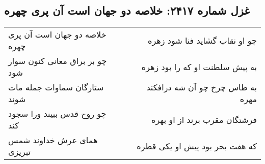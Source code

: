 \begin{center}
\section*{غزل شماره ۲۴۱۷: خلاصه دو جهان است آن پری چهره}
\label{sec:2417}
\begin{longtable}{l p{0.5cm} r}
خلاصه دو جهان است آن پری چهره
&&
چو او نقاب گشاید فنا شود زهره
\\
چو بر براق معانی کنون سوار شود
&&
به پیش سلطنت او که را بود زهره
\\
ستارگان سماوات جمله مات شوند
&&
به طاس چرخ چو آن شه درافکند مهره
\\
چو روح قدس ببیند ورا سجود کند
&&
فرشتگان مقرب برند از او بهره
\\
همای عرش خداوند شمس تبریزی
&&
که هفت بحر بود پیش او یکی قطره
\\
\end{longtable}
\end{center}
